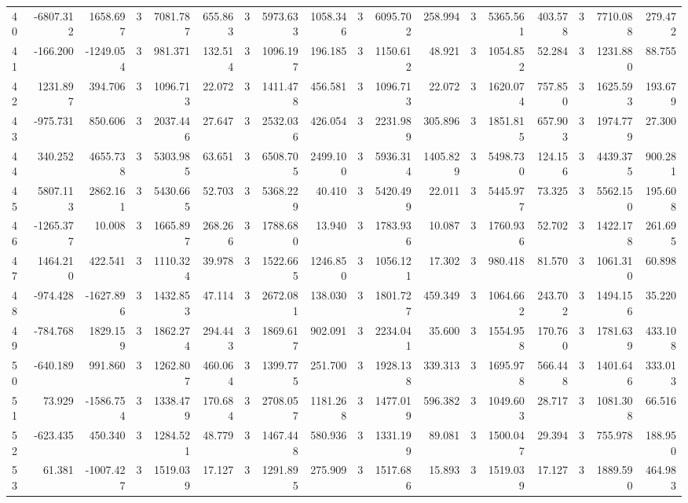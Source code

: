 \begin{table}[ht]
\begin{tabular}{lrrrrrrrrrrrrrrrrr}
40 & -6807.312 & 1658.697 & 3 & 7081.787 & 655.863 & 3 & 5973.633 & 1058.346 & 3 & 6095.702 & 258.994 & 3 & 5365.561 & 403.578 & 3 & 7710.088 & 279.472 \\
41 & -166.200 & -1249.054 & 3 & 981.371 & 132.514 & 3 & 1096.197 & 196.185 & 3 & 1150.612 & 48.921 & 3 & 1054.852 & 52.284 & 3 & 1231.880 & 88.755 \\
42 & 1231.897 & 394.706 & 3 & 1096.713 & 22.072 & 3 & 1411.478 & 456.581 & 3 & 1096.713 & 22.072 & 3 & 1620.074 & 757.850 & 3 & 1625.593 & 193.679 \\
43 & -975.731 & 850.606 & 3 & 2037.446 & 27.647 & 3 & 2532.036 & 426.054 & 3 & 2231.989 & 305.896 & 3 & 1851.815 & 657.903 & 3 & 1974.779 & 27.300 \\
44 & 340.252 & 4655.738 & 3 & 5303.985 & 63.651 & 3 & 6508.705 & 2499.100 & 3 & 5936.314 & 1405.829 & 3 & 5498.730 & 124.156 & 3 & 4439.375 & 900.281 \\
45 & 5807.113 & 2862.161 & 3 & 5430.665 & 52.703 & 3 & 5368.229 & 40.410 & 3 & 5420.499 & 22.011 & 3 & 5445.977 & 73.325 & 3 & 5562.150 & 195.608 \\
46 & -1265.377 & 10.008 & 3 & 1665.897 & 268.266 & 3 & 1788.680 & 13.940 & 3 & 1783.936 & 10.087 & 3 & 1760.936 & 52.702 & 3 & 1422.178 & 261.695 \\
47 & 1464.210 & 422.541 & 3 & 1110.324 & 39.978 & 3 & 1522.665 & 1246.850 & 3 & 1056.121 & 17.302 & 3 & 980.418 & 81.570 & 3 & 1061.310 & 60.898 \\
48 & -974.428 & -1627.896 & 3 & 1432.853 & 47.114 & 3 & 2672.081 & 138.030 & 3 & 1801.727 & 459.349 & 3 & 1064.662 & 243.702 & 3 & 1494.156 & 35.220 \\
49 & -784.768 & 1829.159 & 3 & 1862.274 & 294.443 & 3 & 1869.617 & 902.091 & 3 & 2234.041 & 35.600 & 3 & 1554.958 & 170.760 & 3 & 1781.639 & 433.108 \\
50 & -640.189 & 991.860 & 3 & 1262.807 & 460.064 & 3 & 1399.775 & 251.700 & 3 & 1928.138 & 339.313 & 3 & 1695.978 & 566.448 & 3 & 1401.646 & 333.013 \\
51 & 73.929 & -1586.754 & 3 & 1338.479 & 170.684 & 3 & 2708.057 & 1181.268 & 3 & 1477.019 & 596.382 & 3 & 1049.603 & 28.717 & 3 & 1081.308 & 66.516 \\
52 & -623.435 & 450.340 & 3 & 1284.521 & 48.779 & 3 & 1467.448 & 580.936 & 3 & 1331.199 & 89.081 & 3 & 1500.047 & 29.394 & 3 & 755.978 & 188.950 \\
53 & 61.381 & -1007.427 & 3 & 1519.039 & 17.127 & 3 & 1291.895 & 275.909 & 3 & 1517.686 & 15.893 & 3 & 1519.039 & 17.127 & 3 & 1889.590 & 464.983 \\

\end{tabular}
\end{table}

